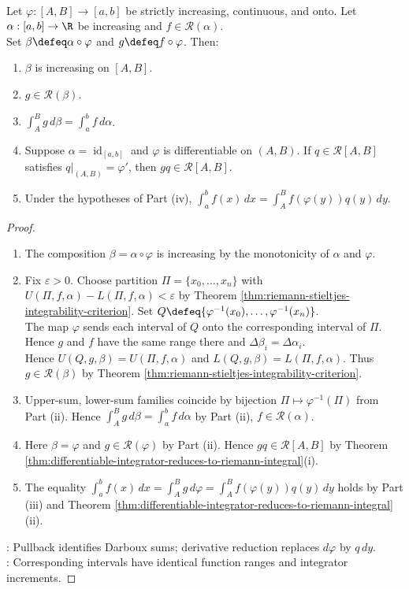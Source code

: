 \begin{theorem} \label{thm:riemann-stieltjes-change-of-variable} \\
Let $\varphi:[A,B]\to[a,b]$ be strictly increasing, continuous, and onto. Let $\alpha:[a,b]\to\R$ be increasing and $f\in\mathcal{R}(\alpha)$.\\
Set $\beta\defeq\alpha\circ\varphi$ and $g\defeq f\circ\varphi$. Then:
\begin{enumerate}[label=(\roman*)]
\setlength{\itemsep}{0pt}
\item $\beta$ is increasing on $[A,B]$.
\item $g\in\mathcal{R}(\beta)$.
\item $\int_A^B g\,d\beta=\int_a^b f\,d\alpha$.
\item Suppose $\alpha=\operatorname{id}_{[a,b]}$ and $\varphi$ is differentiable on $(A,B)$. If $q\in\mathcal{R}[A,B]$ satisfies $q|_{(A,B)}=\varphi'$, then $gq\in\mathcal{R}[A,B]$.
\item Under the hypotheses of Part (iv), $\int_a^b f(x)\,dx=\int_A^B f(\varphi(y))q(y)\,dy$.
\end{enumerate}
\begin{proof}
\begin{enumerate}[label=(\roman*)]
\setlength{\itemsep}{0pt}
\item The composition $\beta=\alpha\circ\varphi$ is increasing by the monotonicity of $\alpha$ and $\varphi$.
\item Fix $\varepsilon>0$. Choose partition $\Pi=\{x_0,\ldots,x_n\}$ with $U(\Pi,f,\alpha)-L(\Pi,f,\alpha)<\varepsilon$ by Theorem \ref{thm:riemann-stieltjes-integrability-criterion}. Set $Q\defeq\{\varphi^{-1}(x_0),\ldots,\varphi^{-1}(x_n)\}$.\\
The map $\varphi$ sends each interval of $Q$ onto the corresponding interval of $\Pi$. Hence $g$ and $f$ have the same range there and $\Delta\beta_i=\Delta\alpha_i$.\\
Hence $U(Q,g,\beta)=U(\Pi,f,\alpha)$ and $L(Q,g,\beta)=L(\Pi,f,\alpha)$. Thus $g\in\mathcal{R}(\beta)$ by Theorem \ref{thm:riemann-stieltjes-integrability-criterion}.
\item Upper-sum, lower-sum families coincide by bijection $\Pi\mapsto\varphi^{-1}(\Pi)$ from Part (ii). Hence $\int_A^B g\,d\beta=\int_a^b f\,d\alpha$ by Part (ii),  $f\in\mathcal{R}(\alpha)$.
\item Here $\beta=\varphi$ and $g\in\mathcal{R}(\varphi)$ by Part (ii). Hence $gq\in\mathcal{R}[A,B]$ by Theorem \ref{thm:differentiable-integrator-reduces-to-riemann-integral}(i).
\item The equality $\int_a^b f(x)\,dx=\int_A^B g\,d\varphi=\int_A^B f(\varphi(y))q(y)\,dy$ holds by Part (iii) and Theorem \ref{thm:differentiable-integrator-reduces-to-riemann-integral}(ii).
\end{enumerate}
: Pullback identifies Darboux sums; derivative reduction replaces $d\varphi$ by $q\,dy$.\\
: Corresponding intervals have identical function ranges and integrator increments.
\end{proof}
\end{theorem}
